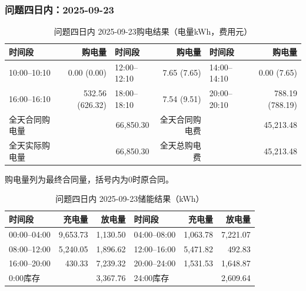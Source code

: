 \par\medskip
\par\noindent\begin{minipage}{\textwidth}
\subsubsection*{问题四日内：2025-09-23}
\begin{table}[H]\centering\small\setlength{\tabcolsep}{4pt}\caption{问题四日内 2025-09-23购电结果（电量kWh，费用元）}
\begin{tabular}{lr lr lr}\toprule
时间段 & 购电量 & 时间段 & 购电量 & 时间段 & 购电量\\\midrule
10:00--10:10 & 0.00 (0.00) & 12:00--12:10 & 7.65 (7.65) & 14:00--14:10 & 0.00 (7.65)\\
16:00--16:10 & 532.56 (626.32) & 18:00--18:10 & 7.54 (9.51) & 20:00--20:10 & 788.19 (788.19)\\
\midrule
全天合同购电量 & \multicolumn{2}{r}{66,850.30} & 全天合同购电费 & \multicolumn{2}{r}{45,213.48}\\
全天实际购电量 & \multicolumn{2}{r}{66,850.30} & 全天总购电费 & \multicolumn{2}{r}{45,213.48}\\
\bottomrule\end{tabular}\end{table}
\noindent\small 购电量列为最终合同量，括号内为0时原合同。\normalsize
\begin{table}[H]\centering\small\setlength{\tabcolsep}{4pt}\caption{问题四日内 2025-09-23储能结果（kWh）}
\begin{tabular}{lrr lrr}\toprule
时间段 & 充电量 & 放电量 & 时间段 & 充电量 & 放电量\\\midrule
00:00--04:00 & 9,653.73 & 1,130.50 & 04:00--08:00 & 1,063.78 & 7,221.07\\
08:00--12:00 & 5,240.05 & 1,896.62 & 12:00--16:00 & 5,471.82 & 492.83\\
16:00--20:00 & 430.33 & 7,239.32 & 20:00--24:00 & 1,531.53 & 1,648.87\\
\midrule
0:00库存 & \multicolumn{2}{r}{3,367.76} & 24:00库存 & \multicolumn{2}{r}{2,609.64}\\
\bottomrule\end{tabular}\end{table}
\end{minipage}\par

